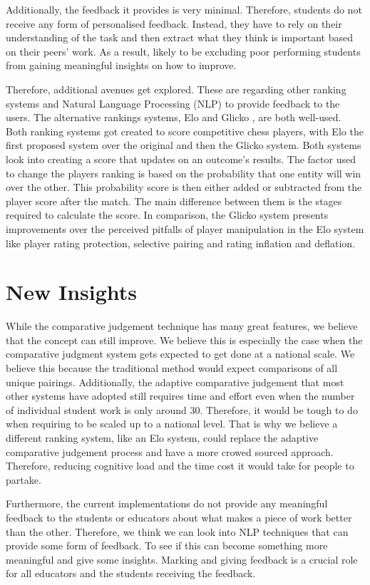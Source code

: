 	Additionally, the feedback it provides is very minimal. Therefore, students do not receive any form of personalised feedback. Instead, they have to rely on their understanding of the task and then extract what they think is important based on their peers' work. As a result, likely to be excluding poor performing students from gaining meaningful insights on how to improve.
	
	Therefore, additional avenues get explored. These are regarding other ranking systems and Natural Language Processing (NLP) to provide feedback to the users. The alternative rankings systems, Elo and Glicko \cite{elo1978rating, glickman1995glicko, glickman2012example}, are both well-used. Both ranking systems got created to score competitive chess players, with Elo the first proposed system over the original and then the Glicko system. Both systems look into creating a score that updates on an outcome's results. The factor used to change the players ranking is based on the probability that one entity will win over the other. This probability score is then either added or subtracted from the player score after the match. The main difference between them is the stages required to calculate the score. In comparison, the Glicko system presents improvements over the perceived pitfalls of player manipulation in the Elo system like player rating protection, selective pairing and rating inflation and deflation.
	
	\section{New Insights}
	While the comparative judgement technique has many great features, we believe that the concept can still improve. We believe this is especially the case when the comparative judgment system gets expected to get done at a national scale. We believe this because the traditional method would expect comparisons of all unique pairings. Additionally, the adaptive comparative judgement that most other systems have adopted still requires time and effort even when the number of individual student work is only around 30. Therefore, it would be tough to do when requiring to be scaled up to a national level. That is why we believe a different ranking system, like an Elo system, could replace the adaptive comparative judgement process and have a more crowed sourced approach. Therefore, reducing cognitive load and the time cost it would take for people to partake. 
	
	Furthermore, the current implementations do not provide any meaningful feedback to the students or educators about what makes a piece of work better than the other. Therefore, we think we can look into NLP techniques that can provide some form of feedback. To see if this can become something more meaningful and give some insights. Marking and giving feedback is a crucial role for all educators and the students receiving the feedback.


